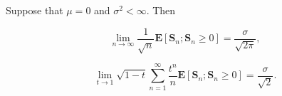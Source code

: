 Suppose that $\mu = 0$ and $\sigma^2 < \infty$. Then

$$\lim_{n \to \infty} \frac{1}{\sqrt{n}} \mathbf{E}[\mathbf{S}_n; \mathbf{S}_n \geq 0] = \frac{\sigma}{\sqrt{2\pi}},$$

$$\lim_{t \to 1} \sqrt{1 - t} \sum_{n=1}^{\infty} \frac{t^n}{n} \mathbf{E}[\mathbf{S}_n; \mathbf{S}_n \geq 0] = \frac{\sigma}{\sqrt{2}}.$$